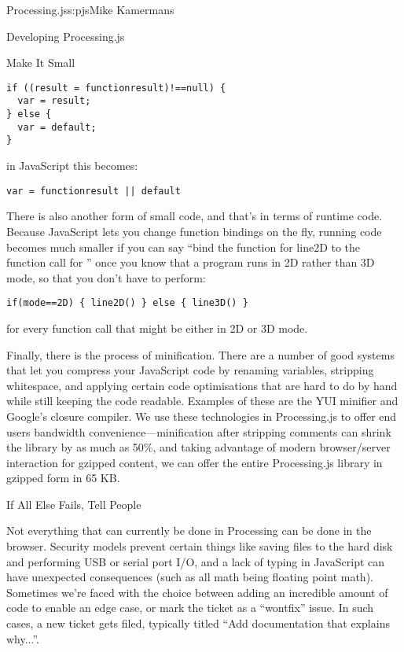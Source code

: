 \begin{aosachapter}{Processing.js}{s:pjs}{Mike Kamermans}
\begin{aosasect1}{Developing Processing.js}
\begin{aosasect2}{Make It Small}
\begin{verbatim}
if ((result = functionresult)!==null) {
  var = result;
} else {
  var = default;
}
\end{verbatim}

\noindent in JavaScript this becomes:

\begin{verbatim}
var = functionresult || default
\end{verbatim}

There is also another form of small code, and that's in terms of
runtime code. Because JavaScript lets you change function bindings on
the fly, running code becomes much smaller if you can say ``bind the
function for line2D to the function call for '' once you
know that a program runs in 2D rather than 3D mode, so that you don't
have to perform:

\begin{verbatim}
if(mode==2D) { line2D() } else { line3D() }
\end{verbatim}

\noindent for every function call that might be either in 2D or 3D mode.

Finally, there is the process of minification. There are a number of
good systems that let you compress your JavaScript code by
renaming variables, stripping whitespace, and applying certain code
optimisations that are hard to do by hand while still keeping the code
readable. Examples of these are the YUI minifier and Google's closure
compiler. We use these technologies in Processing.js to offer end
users bandwidth convenience---minification after stripping comments
can shrink the library by as much as 50\%, and taking advantage of
modern browser/server interaction for gzipped content, we can offer
the entire Processing.js library in gzipped form in 65 KB.

\end{aosasect2}

\begin{aosasect2}{If All Else Fails, Tell People}

Not everything that can currently be done in Processing can be done in
the browser. Security models prevent certain things like saving files
to the hard disk and performing USB or serial port I/O, and a lack of
typing in JavaScript can have unexpected consequences (such as all
math being floating point math). Sometimes we're faced with the choice
between adding an incredible amount of code to enable an edge case, or
mark the ticket as a ``wontfix'' issue. In such cases, a new ticket gets
filed, typically titled ``Add documentation that explains why...''.


\end{aosasect2}
\end{aosasect1}
\end{aosachapter}
